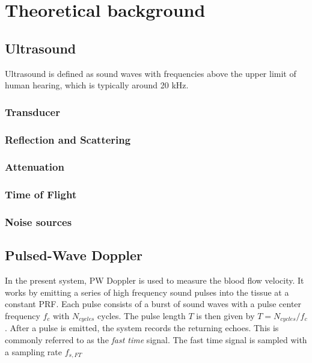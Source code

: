 
\chapter{Theoretical background}%
\label{ch:theory}

\section{Ultrasound}
\label{sec:theory_ultrasound}

Ultrasound is defined as sound waves with frequencies above the upper limit of human hearing, which is typically around 20 kHz. 

\subsection{Transducer}

\subsection{Reflection and Scattering}

\subsection{Attenuation}

\subsection{Time of Flight}

\subsection{Noise sources}

\section{Pulsed-Wave Doppler}
\label{sec:theory_pw_doppler}

In the present system, \gls{PW Doppler} is used to measure the blood flow velocity. It works by emitting a series of high frequency sound pulses into the tissue at a constant \gls{PRF}. Each pulse consists of a burst of sound waves with a pulse center frequency $f_c$ with $N_{cycles}$ cycles. The pulse length $T$ is then given by $T = N_{cycles} / f_c$. After a pulse is emitted, the system records the returning echoes. This is commonly referred to as the \textit{fast time} signal. The fast time signal is sampled with a sampling rate $f_{s, FT}$

